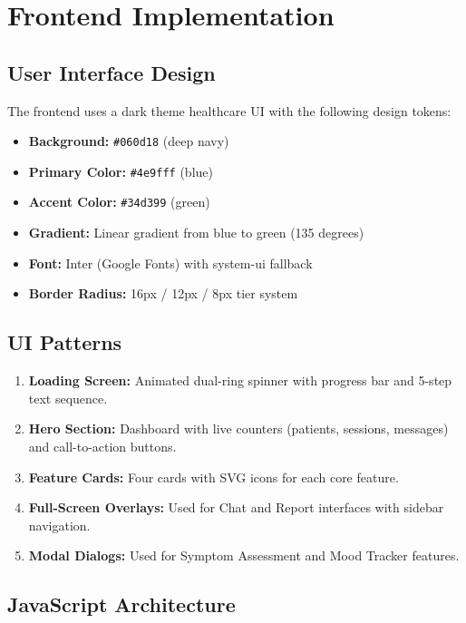 \documentclass[12pt,a4paper]{report}
\begin{document}
\section{Frontend Implementation}

\subsection{User Interface Design}

The frontend uses a dark theme healthcare UI with the following design tokens:

\begin{itemize}
    \item \textbf{Background:} \texttt{\#060d18} (deep navy)
    \item \textbf{Primary Color:} \texttt{\#4e9fff} (blue)
    \item \textbf{Accent Color:} \texttt{\#34d399} (green)
    \item \textbf{Gradient:} Linear gradient from blue to green (135 degrees)
    \item \textbf{Font:} Inter (Google Fonts) with system-ui fallback
    \item \textbf{Border Radius:} 16px / 12px / 8px tier system
\end{itemize}

\subsection{UI Patterns}

\begin{enumerate}
    \item \textbf{Loading Screen:} Animated dual-ring spinner with progress bar and 5-step text sequence.
    \item \textbf{Hero Section:} Dashboard with live counters (patients, sessions, messages) and call-to-action buttons.
    \item \textbf{Feature Cards:} Four cards with SVG icons for each core feature.
    \item \textbf{Full-Screen Overlays:} Used for Chat and Report interfaces with sidebar navigation.
    \item \textbf{Modal Dialogs:} Used for Symptom Assessment and Mood Tracker features.
\end{enumerate}

\subsection{JavaScript Architecture}
\end{document}
